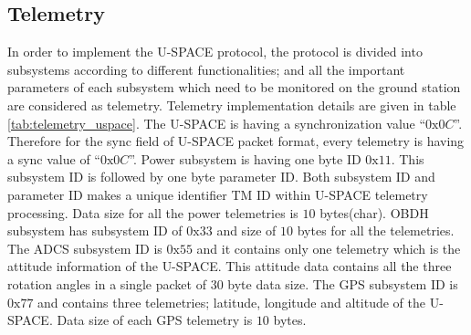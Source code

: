 \subsection{Telemetry}
\label{Number_of_telemetries}
In order to implement the \ac{U-SPACE} protocol, the protocol is divided into subsystems according to different functionalities; and  all the important parameters of each subsystem which need to be monitored on the ground station are considered as telemetry. Telemetry implementation details are given in table \ref{tab:telemetry_uspace}. The \ac{U-SPACE} is having a synchronization value ``$0\text{x}0C$''. Therefore for the sync field of \ac{U-SPACE} packet format, every telemetry is having a sync value of ``$0\text{x}0C$''. Power subsystem is having one byte ID $0\text{x}11$. This subsystem ID is followed by one byte parameter ID. Both subsystem ID and parameter ID makes a unique identifier TM ID within U-SPACE telemetry processing. Data size for all the power telemetries is $10$ bytes(char). \ac{OBDH} subsystem has subsystem ID of $ 0\text{x}33 $ and size of $10$ bytes for all the telemetries. The \ac{ADCS} subsystem ID is $0\text{x}55$ and it contains only one telemetry which is the attitude information of 
the \ac{U-SPACE}. This attitude data contains all the three rotation angles in a single packet of $30$ byte data size. The GPS subsystem ID is $ 0\text{x}77 $ and contains three telemetries; latitude, longitude and altitude of the \ac{U-SPACE}. Data size of each GPS telemetry is $10$ bytes.

